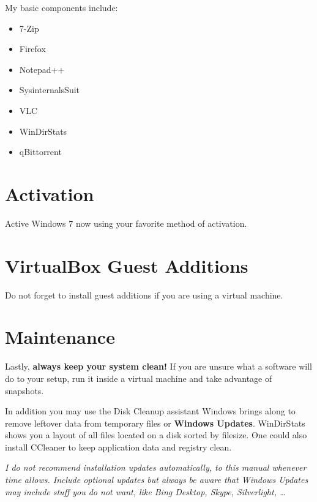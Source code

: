 \documentclass{itsarticle}
\begin{document}

My basic components include:

\begin{itemize}
    \item 7-Zip
    \item Firefox
    \item Notepad++
    \item SysinternalsSuit
    \item VLC
    \item WinDirStats
    \item qBittorrent
\end{itemize}

\section{Activation}
\label{sec:activation}

Active Windows 7 now using your favorite method of activation.

\section{VirtualBox Guest Additions}
\label{sec:guest_additions}

Do not forget to install guest additions if you are using a virtual machine.

\section{Maintenance}
\label{sec:maintenance}

Lastly, \textbf{always keep your system clean!} If you are unsure what a
software will do to your setup, run it inside a virtual machine and take
advantage of snapshots.

In addition you may use the Disk Cleanup assistant Windows brings along to
remove leftover data from temporary files or \textbf{Windows Updates}.
WinDirStats shows you a layout of all files located on a disk sorted by
filesize. One could also install CCleaner to keep application data and registry
clean.

\textit{I do not recommend installation updates automatically, to this manual
whenever time allows. Include optional updates but always be aware that Windows
Updates may include stuff you do not want, like Bing Desktop, Skype,
Silverlight, \ldots}
\end{document}
